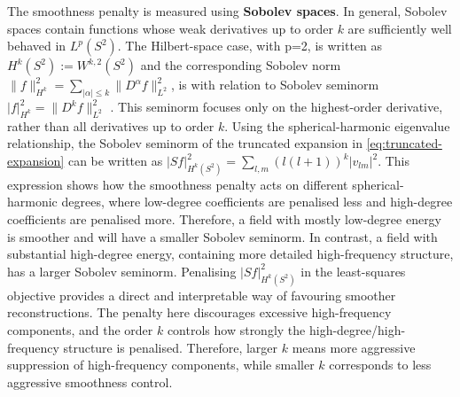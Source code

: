 The smoothness penalty is measured using \textbf{Sobolev spaces}. In general, Sobolev spaces contain functions whose weak derivatives up to order $k$ are sufficiently well behaved in $L^p(S^2)$. The Hilbert-space case, with p=2, is written as $H^k(S^2):=W^{k,2}(S^2)$ and the corresponding Sobolev norm $\|f\|_{H^k}^2 = \sum_{|\alpha|\le k}\|D^\alpha f\|^2_{L^2}$, is
with relation to Sobolev seminorm $|f|_{H^k}^2 = \|D^k f\|^2_{L^2}$ . This seminorm focuses only on the highest-order derivative, rather than all derivatives up to order $k$. Using the spherical-harmonic eigenvalue relationship, the Sobolev seminorm of the truncated expansion in \cref{eq:truncated-expansion} can be written as $|Sf|^2_{H^k(S^2)} = \sum_{l,m}(l(l+1))^k|v_{lm}|^2$. This expression shows how the smoothness penalty acts on different spherical-harmonic degrees, where low-degree coefficients are penalised less and high-degree coefficients are penalised more. Therefore, a field with mostly low-degree energy is smoother and will have a smaller Sobolev seminorm. In contrast, a field with substantial high-degree energy, containing more detailed high-frequency structure, has a larger Sobolev seminorm. Penalising $|Sf|^2_{H^k(S^2)}$ in the least-squares objective provides a direct and interpretable way of favouring smoother reconstructions. The penalty here discourages excessive high-frequency components, and the order $k$ controls how strongly the high-degree/high-frequency structure is penalised. Therefore, larger $k$ means more aggressive suppression of high-frequency components, while smaller $k$ corresponds to less aggressive smoothness control. 
 
